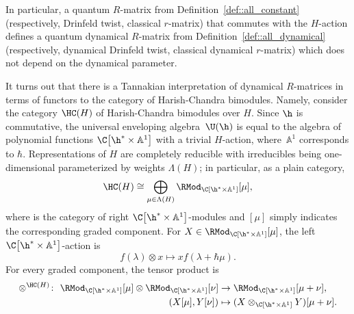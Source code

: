 	\begin{Remark}
		In particular, a quantum $R$-matrix from Definition~\ref{def::all_constant} (respectively, Drinfeld twist, classical $r$-matrix) that commutes with the $H$-action defines a quantum dynamical $R$-matrix from Definition~\ref{def::all_dynamical} (respectively, dynamical Drinfeld twist, classical dynamical $r$-matrix) which does not depend on the dynamical parameter.
	\end{Remark}
	
	It turns out that there is a Tannakian interpretation of dynamical $R$-matrices in terms of functors to the category of Harish-Chandra bimodules. Namely, consider the category $\HC(H)$ of Harish-Chandra bimodules over $H$. Since $\h$ is commutative, the universal enveloping algebra~$\U(\h)$ is equal to the algebra of polynomial functions $\C\bigl[\h^* \times \mathbb{A}^1\bigr]$ with a trivial $H$-action, where~$\mathbb{A}^1$ corresponds to $\hbar$. Representations of $H$ are completely reducible with irreducibles being one-dimensional parameterized by weights $\Lambda(H)$; in particular, as a plain category,
	\[
	\HC(H) \cong \bigoplus\limits_{\mu \in \Lambda(H)} \RMod_{\C[\h^* \times \mathbb{A}^1]}[\mu],
	\]
	where  is the category of right $\C\bigl[\h^* \times \mathbb{A}^1\bigr]$-modules and $[\mu]$ simply indicates the corresponding graded component. For $X\in \RMod_{\C[\h^* \times \mathbb{A}^1]}[\mu]$, the left $\C\bigl[\h^* \times \mathbb{A}^1\bigr]$-action is
	\begin{equation}
		\label{eq::hc_left_action}
		f(\lambda) \otimes x \mapsto x f(\lambda+\hbar \mu).
	\end{equation}
	For every graded component, the tensor product is
	\begin{align}
			\otimes^{\HC(H)}\colon\ \RMod_{\C[\h^* \times \mathbb{A}^1]} [\mu] \otimes \RMod_{\C[\h^* \times \mathbb{A}^1]} [\nu] & \rightarrow \RMod_{\C[\h^* \times \mathbb{A}^1]} [\mu+\nu],\nonumber \\
(X[\mu],Y[\nu]) & \mapsto (X \otimes_{\C[\h^* \times \mathbb{A}^1]} Y)[\mu+\nu].\label{eq::hc_h_tensor_product}
	\end{align}
	
